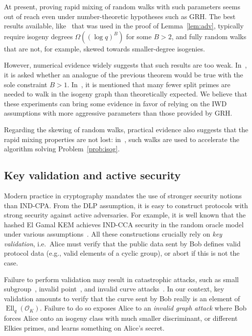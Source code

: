 \documentclass{article}
\renewcommand{\O}{\mathcal{O}}
\theoremstyle{definition}
\DeclareMathOperator{\Ell}{Ell}
\begin{document}
At present, proving rapid mixing of random walks with such
parameters seems out of reach even under number-theoretic
hypotheses such as GRH. The best results available,
like~\cite[Theorem~1.5]{jao+miller+venkatesan09}
that was used in the proof of Lemma~\ref{lem:adv},
typically require isogeny degrees $\Omega((\log q)^B)$
for some $B>2$, and fully random walks that are not,
for example, skewed towards smaller-degree isogenies.

However, numerical evidence widely suggests that
such results are too weak. In~\cite[7.2]{jao+miller+venkatesan09},
it is asked whether an analogue of the previous theorem would
be true with the sole constraint $B>1$. In~\cite[Section~3]{GHS},
it is mentioned that many fewer split primes are needed to walk
in the isogeny graph than theoretically expected.
We believe that these experiments can bring some evidence
in favor of relying on the IWD assumptions with more aggressive
parameters than those provided by GRH.

Regarding the skewing of random walks,
practical evidence also suggests that the rapid mixing
properties are not lost: in~\cite{galbraith+stolbunov11},
such walks are used to accelerate the algorithm
solving Problem~\ref{prob:isog}.

\subsection{Key validation and active security}

Modern practice in cryptography mandates the use of stronger security
notions than IND-CPA.  From the DLP assumption, it is easy to
construct protocols with strong security against active adversaries.
For example, it is well known that the hashed El Gamal KEM achieves
IND-CCA security in the random oracle model under various
assumptions~\cite[§7]{10.1007/3-540-45353-9_12,cryptoeprint:1999:007,doi:10.1137/S0097539702403773}.
All these constructions crucially rely on \emph{key validation}, i.e.\
Alice must verify that the public data sent by Bob defines valid
protocol data (e.g., valid elements of a cyclic group), or abort if
this is not the case.

Failure to perform validation may result in catastrophic attacks, such
as small subgroup~\cite{10.1007/BFb0052240}, invalid
point~\cite{10.1007/3-540-44598-6_8}, and invalid curve
attacks~\cite{Ciet2005}.  In our context, key validation amounts to
verify that the curve sent by Bob really is an element of
$\Ell_q(\O_K)$. Failure to do so exposes Alice to an \emph{invalid
  graph attack} where Bob forces Alice onto an isogeny class with much
smaller discriminant, or different Elkies primes, and learns something
on Alice's secret.
\end{document}
